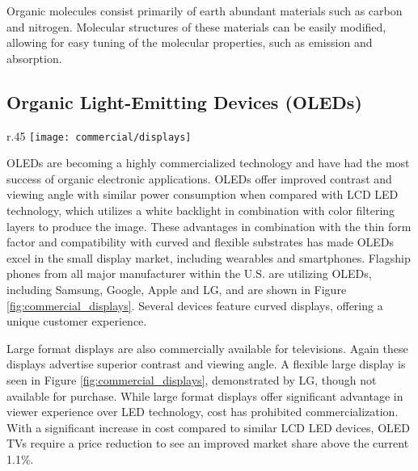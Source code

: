 \documentclass[../thesis.tex]{subfiles}
\begin{document}
Organic molecules consist primarily of earth abundant materials such as carbon and nitrogen.  
Molecular structures of these materials can be easily modified, allowing for easy tuning of the molecular properties, such as emission and absorption.


\subsection{Organic Light-Emitting Devices (OLEDs)}

\begin{wrapfigure}{r}{.45\textwidth}
\centering
\texttt{[image: commercial/displays]}
\caption{(a) Commercial OLED white lighting from OLEDworks. (b) Commercial OLED TVs from LG. (c) Flexible OLED TV demo from LG.  (d) Smartphones from Apple, Google and Samsung.}
\label{fig:commercial_displays}
\end{wrapfigure}

OLEDs are becoming a highly commercialized technology and have had the most success of organic electronic applications.\supercite{Han2014a,Soneira2016,Soneira2017,Kalyani2017}
OLEDs offer improved contrast and viewing angle with similar power consumption when compared with LCD LED technology, which utilizes a white backlight in combination with color filtering layers to produce the image. \supercite{Morrison2017} 
These advantages in combination with the thin form factor and compatibility with curved and flexible substrates has made OLEDs excel in the small display market, including wearables and smartphones.
Flagship phones from all major manufacturer within the U.S. are utilizing OLEDs, including Samsung, Google, Apple and LG, and are shown in Figure \ref{fig:commercial_displays}.\supercite{Rozario2017,Morrison2018}
Several devices feature curved displays, offering a unique customer experience.

Large format displays are also commercially available for televisions.\supercite{Rozario2017,Morrison2018}
Again these displays advertise superior contrast and viewing angle.
A flexible large display is seen in Figure \ref{fig:commercial_displays}, demonstrated by LG, though not available for purchase.\supercite{Statt2016}
While large format displays offer significant advantage in viewer experience over LED technology, cost has prohibited commercialization.\supercite{Statt2016}
With a significant increase in cost compared to similar LCD LED devices, OLED TVs require a price reduction to see an improved market share above the current 1.1\%.\supercite{Statista2018}
\end{document}
